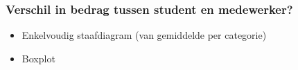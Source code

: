 \documentclass{beamer}
\begin{document}
\begin{frame}
  \frametitle{Verschil in bedrag tussen student en medewerker?}
  \begin{itemize}
    \item \alert<1>{Enkelvoudig staafdiagram} (van gemiddelde per categorie)
    \item \alert<2>{Boxplot}
  \end{itemize}

  \begin{figure}
    \centering
  \end{figure}

\end{frame}
\end{document}
